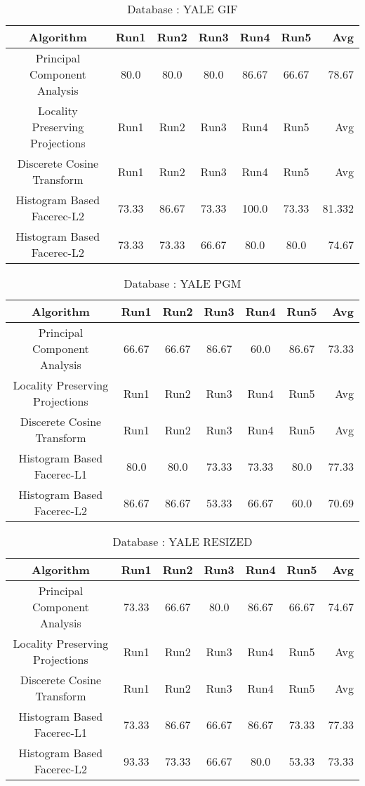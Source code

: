 \documentclass[10pt,a4paper]{article}
\begin{document}
\begin{center}
\begin{table}
\caption{Database : YALE GIF}
\centering
\begin{tabular}{| c | c | c | c | c | c | r | } \hline 
Algorithm & Run1 & Run2 & Run3 & Run4 & Run5 & Avg  \\  
\hline
Principal Component Analysis & 80.0 & 80.0 & 80.0 & 86.67 & 66.67 & 78.67 \\
\hline
Locality Preserving Projections & Run1 & Run2 & Run3 & Run4 & Run5 & Avg \\
\hline
Discerete Cosine Transform & Run1 & Run2 & Run3 & Run4 & Run5 & Avg \\
\hline
Histogram Based Facerec-L2 & 73.33 & 86.67 & 73.33 & 100.0 & 73.33 & 81.332 \\
\hline
Histogram Based Facerec-L2 & 73.33 & 73.33 & 66.67 & 80.0 & 80.0 & 74.67 \\
\hline

\end{tabular}
\end{table}


\begin{table}
\caption{Database : YALE PGM} 

\centering
\begin{tabular}{| c | c | c | c | c | c | r | } \hline 
Algorithm & Run1 & Run2 & Run3 & Run4 & Run5 & Avg  \\  
\hline
Principal Component Analysis & 66.67 & 66.67 & 86.67 & 60.0 & 86.67 & 73.33 \\
\hline
Locality Preserving Projections & Run1 & Run2 & Run3 & Run4 & Run5 & Avg \\
\hline
Discerete Cosine Transform & Run1 & Run2 & Run3 & Run4 & Run5 & Avg \\
\hline
Histogram Based Facerec-L1 & 80.0 & 80.0 & 73.33 & 73.33 & 80.0 & 77.33 \\
\hline
Histogram Based Facerec-L2 & 86.67 & 86.67 & 53.33 & 66.67 & 60.0 & 70.69 \\
\hline

\end{tabular}
\end{table}

\begin{table}
\caption{Database : YALE RESIZED}
\centering
\begin{tabular}{| c | c | c | c | c | c | r | } \hline 
Algorithm & Run1 & Run2 & Run3 & Run4 & Run5 & Avg  \\  
\hline
Principal Component Analysis & 73.33 & 66.67 & 80.0 & 86.67 & 66.67 & 74.67 \\
\hline
Locality Preserving Projections & Run1 & Run2 & Run3 & Run4 & Run5 & Avg \\
\hline
Discerete Cosine Transform & Run1 & Run2 & Run3 & Run4 & Run5 & Avg \\
\hline
Histogram Based Facerec-L1 & 73.33 & 86.67 & 66.67 & 86.67 & 73.33 & 77.33 \\
\hline
Histogram Based Facerec-L2 & 93.33 & 73.33 & 66.67 & 80.0 & 53.33 & 73.33 \\
\hline


\end{tabular}
\end{table}
\end{center}
\end{document}
